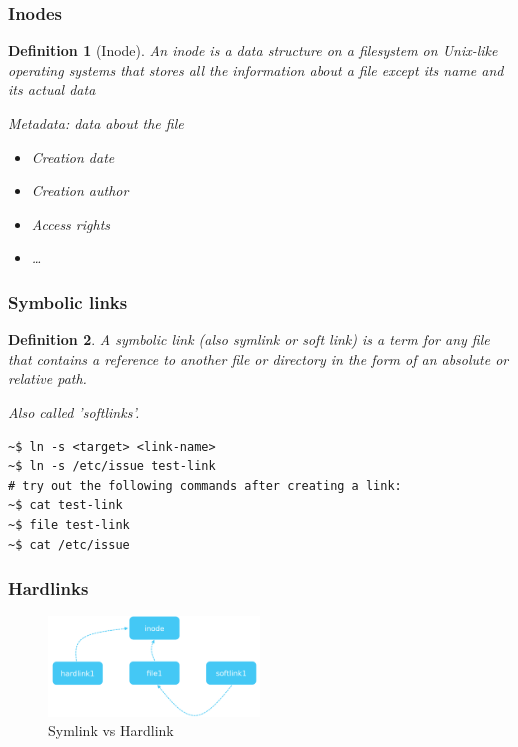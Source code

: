\documentclass{article}
\newtheorem{theorem}{Definition}[section]
\begin{document}
\subsubsection{Inodes}

\begin{theorem}[Inode]
    An inode is a data structure on a filesystem on Unix-like operating systems that 
    stores all the information about a file except its name and its actual data

    Metadata: data about the file
    \begin{itemize}
        \item Creation date
        \item Creation author
        \item Access rights
        \item \dots
    \end{itemize}
\end{theorem}

\subsubsection{Symbolic links}

\begin{theorem}
    A symbolic link (also symlink or soft link) is a term for any 
    file that contains a reference to another file or directory 
    in the form of an absolute or relative path.

    Also called 'softlinks'.
\end{theorem}

\begin{verbatim}
~$ ln -s <target> <link-name>
~$ ln -s /etc/issue test-link
# try out the following commands after creating a link:
~$ cat test-link
~$ file test-link
~$ cat /etc/issue
\end{verbatim}


\subsubsection{Hardlinks}

\begin{figure}[H]
    \centering
    \includegraphics[width=0.5\textwidth]{soft-vs-hard-links.png}
    \caption{Symlink vs Hardlink}
\end{figure}
\end{document}
